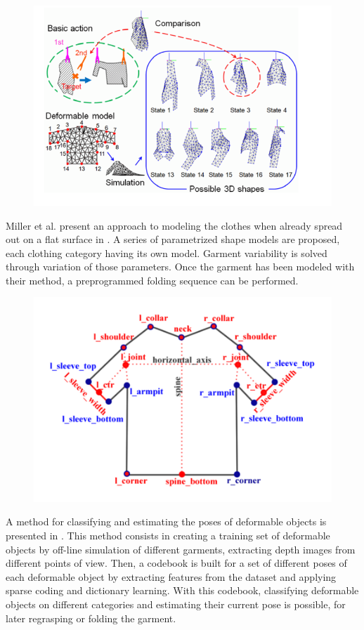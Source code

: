 \begin{figure}[thpb]
    \centering
    \includegraphics[width=0.7
    \textwidth]{figures/SOTA_Kita_2009.png}
    \caption{}
    \label{fig:SOTA_Kita_2009}
\end{figure}

Miller et al. present an approach to modeling the clothes when already spread out on a flat surface in \cite{Miller2011}. A series of parametrized shape models are proposed, each clothing category having its own model. Garment variability is solved through variation of those parameters. Once the garment has been modeled with their method, a preprogrammed folding sequence can be performed.

\begin{figure}[thpb]
    \centering
    \includegraphics[width=0.6
    \textwidth]{figures/SOTA_Miller_2011.png}
    \caption{}
    \label{fig:SOTA_Miller_2011}
\end{figure}

A method for classifying and estimating the poses of deformable objects is presented in \cite{Li2014ICRA}. This method consists in creating a training set of deformable objects by off-line simulation of different garments, extracting depth images from different points of view. Then, a codebook is built for a set of different poses of each deformable object by extracting features from the dataset and applying sparse coding and dictionary learning. With this codebook, classifying deformable objects on different categories and estimating their current pose is possible, for later regrasping or folding the garment.

